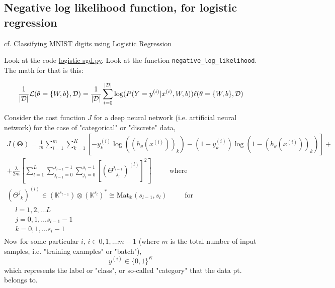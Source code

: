 \documentclass[10pt]{amsart}
\begin{document}
\begin{multicols*}{2}
\subsection{Negative log likelihood function, for logistic regression}

cf. \href{http://deeplearning.net/tutorial/logreg.html}{Classifying MNIST digits using Logistic Regression}  

Look at the code \href{http://deeplearning.net/tutorial/code/logistic_sgd.py}{logistic sgd.py}.  Look at the function \verb|negative_log_likelihood|.  The math for that is this:

\begin{equation}
            \frac{1}{|\mathcal{D}|} \mathcal{L} (\theta=\{W,b\}, \mathcal{D}) =
            \frac{1}{|\mathcal{D}|} \sum_{i=0}^{|\mathcal{D}|}
                \log(P(Y=y^{(i)}|x^{(i)}, W,b)) \\
            \ell (\theta=\{W,b\}, \mathcal{D})
\end{equation}

Consider the cost function $J$ for a deep neural network (i.e. artificial neural network) for the case of "categorical" or "discrete" data, 
\begin{equation}
\begin{gathered}
	J(\mathbf{\Theta}) = \frac{1}{m} \sum_{i=1}^m \sum_{k=1}^K \left[ -y_k^{(i)} \log{ ((h_{\theta}(x^{(i)} ) )_k ) } - (1-y_k^{(i)} ) \log{ (1- (h_{\theta}(x^{(i)} ) )_k ) } \right] + \\
+ \frac{\lambda}{2m} \left[  \sum_{l=1}^L \sum_{j_{l-1}=0}^{s_{l-1}-1} \sum_{ j_l=0}^{ s_l-1} \left[  ( \Theta^{j_{l-1}}_{ \  \  \  j_l} )^{(l)}   \right]^2 \right] \qquad \, \text{ where } \\
(\Theta^j_{ \  \  k} )^{(l)}  \in (\mathbb{K}^{ s_{l-1}} ) \otimes ( \mathbb{K}^{s_l} )^* \cong \text{Mat}_{\mathbb{K}}(s_{l-1},s_l)  \qquad \, \text { for } \\
\begin{aligned}
	& l=1,2,\dots L \\ 
& j = 0,1,\dots s_{l-1} - 1 \\ 
& k = 0,1,\dots s_l - 1 
\end{aligned}
\end{gathered}
\end{equation}
Now for some particular $i$, $i\in 0,1,\dots m-1$ (where $m$ is the total number of input samples, i.e. "training examples" or "batch"), 
\[
y^{(i)} \in \lbrace 0 ,1 \rbrace^K 
\]
which represents the label or "class", or so-called "category" that the data pt. belongs to.  


\end{multicols*}
\end{document}
